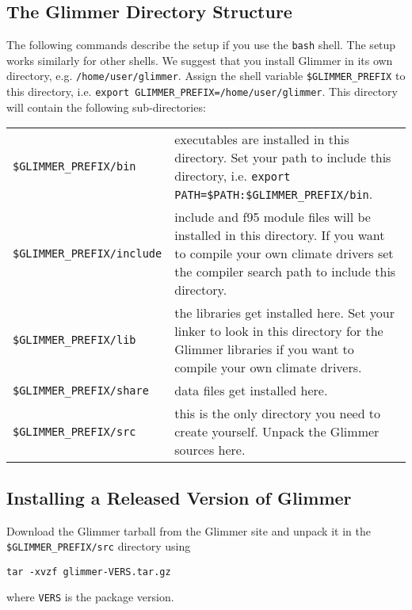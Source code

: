 \subsection{The Glimmer Directory Structure}\label{ug.sec.dirs}
The following commands describe the setup if you use the \texttt{bash}
shell. The setup works similarly for other shells. We suggest that you
install Glimmer in its own directory,
e.g. \texttt{/home/user/glimmer}. Assign the shell variable
\texttt{\$GLIMMER\_PREFIX} to this directory, i.e. \texttt{export
  GLIMMER\_PREFIX=/home/user/glimmer}. This directory will contain the
following sub-directories: 
\begin{center}
 \begin{tabular}{lp{9.5cm}}
   \texttt{\$GLIMMER\_PREFIX/bin} & executables are installed in this
   directory. Set your path to include this directory,
   i.e. \texttt{export PATH=\$PATH:\$GLIMMER\_PREFIX/bin}.  \\ 
   \texttt{\$GLIMMER\_PREFIX/include} & include and f95 module files
   will be installed in this directory. If you want to compile your
   own climate drivers set the compiler search path to include this
   directory. \\ 
   \texttt{\$GLIMMER\_PREFIX/lib} & the libraries get installed
   here. Set your linker to look in this directory for the Glimmer
   libraries if you want to compile your own climate drivers. \\ 
   \texttt{\$GLIMMER\_PREFIX/share} & data files get installed here. \\
   \texttt{\$GLIMMER\_PREFIX/src} & this is the only directory you
   need to create yourself. Unpack the Glimmer sources here.
 \end{tabular}
\end{center}
%
\subsection{Installing a Released Version of Glimmer}\label{ug.sec.tarball}
Download the Glimmer tarball from the Glimmer site and unpack it in
the \texttt{\$GLIMMER\_PREFIX/src} directory using 
\begin{verbatim}
tar -xvzf glimmer-VERS.tar.gz
\end{verbatim}
where \texttt{VERS} is the package version.

